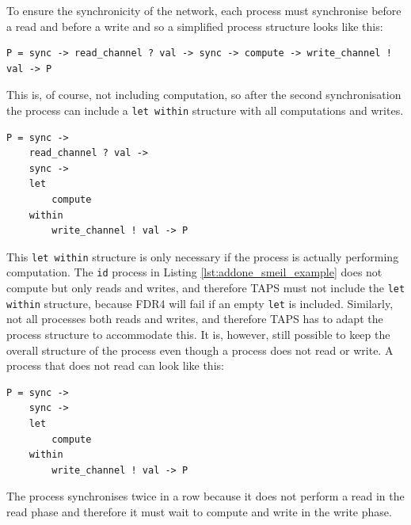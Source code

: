 To ensure the synchronicity of the network, each process must synchronise before a read and before a write and so a simplified process structure looks like this:
\begin{verbatim}
P = sync -> read_channel ? val -> sync -> compute -> write_channel ! val -> P
\end{verbatim}
This is, of course, not including computation, so after the second synchronisation the process can include a \texttt{let within} structure with all computations and writes.
\begin{verbatim}
P = sync ->
    read_channel ? val ->
    sync ->
    let
        compute
    within
        write_channel ! val -> P
\end{verbatim}
This \texttt{let within} structure is only necessary if the process is actually performing computation. The \texttt{id} process in Listing \ref{lst:addone_smeil_example} does not compute but only reads and writes, and therefore TAPS must not include the \texttt{let within} structure, because FDR4 will fail if an empty \texttt{let} is included. Similarly, not all processes both reads and writes, and therefore TAPS has to adapt the process structure to accommodate this. It is, however, still possible to keep the overall structure of the process even though a process does not read or write. A process that does not read can look like this:
\begin{verbatim}
P = sync ->
    sync ->
    let
        compute
    within
        write_channel ! val -> P
\end{verbatim}
The process synchronises twice in a row because it does not perform a read in the read phase and therefore it must wait to compute and write in the write phase. \\

